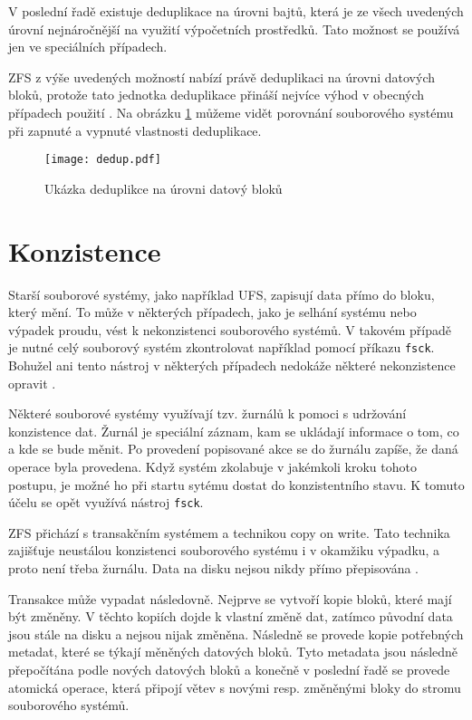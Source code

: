 V poslední řadě existuje deduplikace na úrovni bajtů, která je ze všech uvedených úrovní nejnáročnější na využití výpočetních prostředků. Tato možnost se používá jen ve speciálních případech.

ZFS z výše uvedených možností nabízí právě deduplikaci na úrovni datových bloků, protože tato jednotka deduplikace přináší nejvíce výhod v obecných případech použití \cite{dedup}. Na obrázku \ref{blockdedup} můžeme vidět porovnání souborového systému při zapnuté a vypnuté vlastnosti deduplikace.
\begin{figure}[!h]
    \caption{Ukázka deduplikce na úrovni datový bloků}
    \label{blockdedup}
    \texttt{[image: dedup.pdf]}
\end{figure}
\section{Konzistence}
\label{consitence}
Starší souborové systémy, jako například UFS, zapisují data přímo do bloku, který mění. To může v některých případech, jako je selhání systému nebo výpadek proudu, vést k nekonzistenci souborového systémů. V takovém případě je nutné celý souborový systém zkontrolovat například pomocí příkazu \verb|fsck|. Bohužel ani tento nástroj v některých případech nedokáže některé nekonzistence opravit \cite{transaction}.

Některé souborové systémy využívají tzv. žurnálů k pomoci s udržování konzistence dat. Žurnál je speciální záznam, kam se ukládají informace o tom, co a kde se bude měnit. Po provedení popisované akce se do žurnálu zapíše, že daná operace byla provedena. Když systém zkolabuje v jakémkoli kroku tohoto postupu, je možné ho při startu sytému dostat do konzistentního stavu. K tomuto účelu se opět využívá nástroj \verb|fsck|.

ZFS přichází s transakčním systémem a technikou copy on write. Tato technika zajišťuje neustálou konzistenci souborového systému i v okamžiku výpadku, a proto není třeba žurnálu. Data na disku nejsou nikdy přímo přepisována \cite{transaction}.

Transakce může vypadat následovně. Nejprve se vytvoří kopie bloků, které mají být změněny. V těchto kopiích dojde k vlastní změně dat, zatímco původní data jsou stále na disku a nejsou nijak změněna. Následně se provede kopie potřebných metadat, které se týkají měněných datových bloků. Tyto metadata jsou následně přepočítána podle nových datových bloků a konečně v poslední řadě se provede atomická operace, která připojí větev s novými resp. změněnými bloky do stromu souborového systémů.

